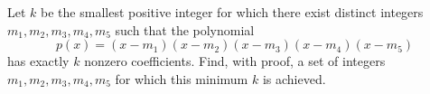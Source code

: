 Let $k$ be the smallest positive integer for which there exist
distinct integers $m_1, m_2, m_3, m_4, m_5$ such that the polynomial
\[
p(x) = (x-m_1)(x-m_2)(x-m_3)(x-m_4)(x-m_5)
\]
has exactly $k$ nonzero coefficients. Find, with proof, a set of
integers $m_1, m_2, m_3, m_4, m_5$ for which this minimum $k$ is achieved.
